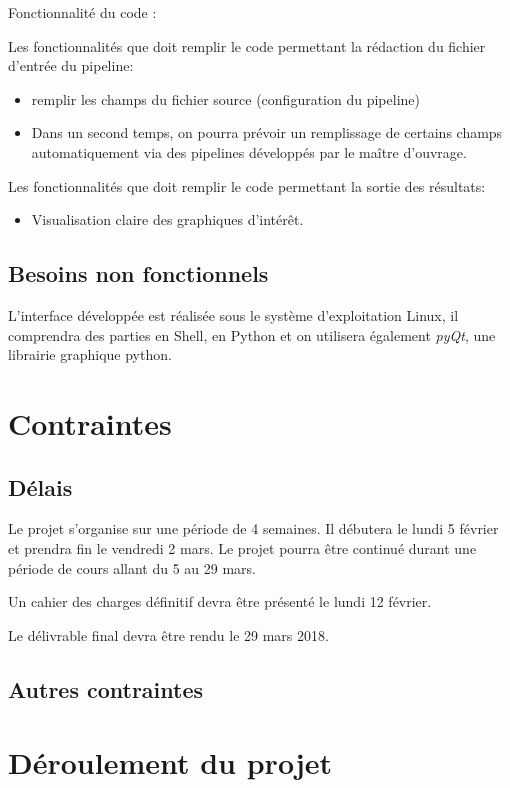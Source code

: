 \documentclass[12pt]{article}
\begin{document}
Fonctionnalité du code :

Les fonctionnalités que doit remplir le code permettant la rédaction du fichier d'entrée du pipeline:

\begin{itemize}
\item remplir les champs du fichier source (configuration du pipeline)
\item Dans un second temps, on pourra prévoir un remplissage de certains champs automatiquement via des pipelines développés par le maître d'ouvrage.
\end{itemize}

Les fonctionnalités que doit remplir le code permettant la sortie des résultats: 

\begin{itemize}
\item Visualisation claire des graphiques d’intérêt.
\end{itemize}

\subsection{Besoins non fonctionnels}

L'interface développée est réalisée sous le système d'exploitation Linux, il comprendra des parties en Shell, en Python et on utilisera également \textit{pyQt}, une librairie graphique python.

\section{Contraintes}
\subsection{Délais}

Le projet s'organise sur une période de 4 semaines. Il débutera le lundi 5 février et prendra fin le vendredi 2 mars. Le projet pourra être continué durant une période de cours allant du 5 au 29 mars.

Un cahier des charges définitif devra être présenté le lundi 12 février.

Le délivrable final devra être rendu le 29 mars 2018.

\subsection{Autres contraintes}
\section{Déroulement du projet}
\end{document}
